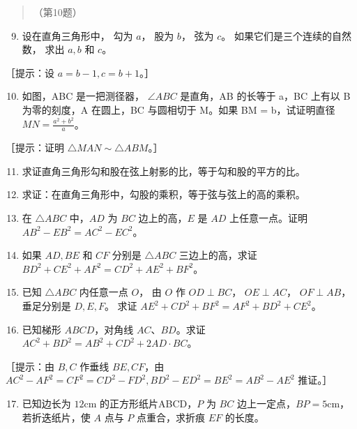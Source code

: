 \begin{quote}
（第10题）
\end{quote}

\begin{enumerate}
\setcounter{enumi}{8}
\item
  设在直角三角形中， 勾为 \(a\)， 股为 \(b\)， 弦为 \(c\)。
  如果它们是三个连续的自然数， 求出 \(a, b\) 和 \(c\)。
\end{enumerate}

［提示：设 \(a = b - 1, c = b + 1\)。］

\begin{enumerate}
\setcounter{enumi}{9}
\item
  如图，ABC 是一把测径器， \(\angle ABC\) 是直角，AB 的长等于 a，BC
  上有以 B 为零的刻度，A 在圆上，BC 与圆相切于 M。如果 BM =
  b，试证明直径 \(MN = \frac{a^{2} + b^{2}}{a}\)。
\end{enumerate}

［提示：证明 \(\triangle MAN \sim \triangle ABM\)。］

\begin{enumerate}
\setcounter{enumi}{10}
\item
  求证直角三角形勾和股在弦上射影的比，等于勾和股的平方的比。
\item
  求证：在直角三角形中，勾股的乘积，等于弦与弦上的高的乘积。
\item
  在 \(\triangle ABC\) 中，\(AD\) 为 \(BC\) 边上的高，\(E\) 是 \(AD\)
  上任意一点。证明 \(AB^2 - EB^2 = AC^2 - EC^2\)。
\item
  如果 \(AD, BE\) 和 \(CF\) 分别是 \(\triangle ABC\) 三边上的高，求证
  \(BD^2 + CE^2 + AF^2 = CD^2 + AE^2 + BF^2\)。
\item
  已知 \(\triangle ABC\) 内任意一点 \(O\)， 由 \(O\) 作
  \(OD \perp BC\)， \(OE \perp AC\)， \(OF \perp AB\)， 垂足分别是
  \(D, E, F\)。 求证 \(AE^2 + CD^2 + BF^2 = AF^2 + BD^2 + CE^2\)。
\item
  已知梯形 \(ABCD\)，对角线 \(AC\)、\(BD\)。求证
  \(AC^2 + BD^2 = AB^2 + CD^2 + 2AD \cdot BC\)。
\end{enumerate}

［提示：由 \(B, C\) 作垂线 \(BE, CF\)，由
\(AC^2 - AF^2 = CF^2 = CD^2 - FD^2, BD^2 - ED^2 = BE^2 = AB^2 - AE^2\)
推证。］

\begin{enumerate}
\setcounter{enumi}{16}
\item
  已知边长为 \(12\mathrm{cm}\) 的正方形纸片ABCD，\(P\) 为 \(BC\)
  边上一定点，\(BP = 5\mathrm{cm}\)，若折迭纸片，使 \(A\) 点与 \(P\)
  点重合，求折痕 \(EF\) 的长度。
\end{enumerate}

